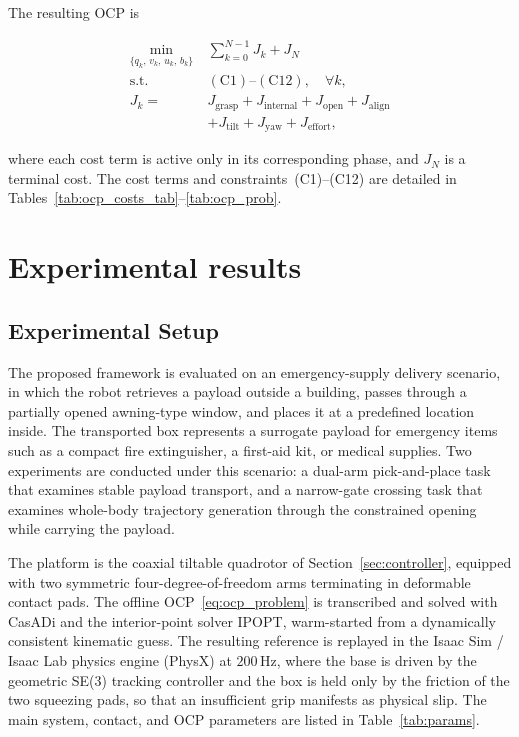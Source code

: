 \documentclass[letterpaper, 10 pt, conference]{ieeeconf}  %
\begin{document}
The resulting OCP is

\begin{equation}
\label{eq:ocp_problem}
\begin{aligned}
\min_{\{q_k,\,v_k,\,u_k,\,b_k\}}\ & \sum_{k=0}^{N-1} J_k + J_N\\[2pt]
\text{s.t.}\ & (\mathrm{C1})\text{--}(\mathrm{C12}),\quad \forall k,\\[3pt]
J_k =\ & J_{\mathrm{grasp}}+J_{\mathrm{internal}}+J_{\mathrm{open}}+J_{\mathrm{align}}\\
  & +J_{\mathrm{tilt}}+J_{\mathrm{yaw}}+J_{\mathrm{effort}},
\end{aligned}
\end{equation}

where each cost term is active only in its corresponding phase,
and $J_N$ is a terminal cost. The cost terms and
constraints~(C1)--(C12) are detailed in
Tables~\ref{tab:ocp_costs_tab}--\ref{tab:ocp_prob}.

\section{Experimental results}

\subsection{Experimental Setup}
The proposed framework is evaluated on an emergency-supply delivery scenario, in which the robot retrieves a payload outside a building, passes through a partially opened awning-type window, and places it at a predefined location inside.
The transported box represents a surrogate payload for emergency items such as a compact fire extinguisher, a first-aid kit, or medical supplies.
Two experiments are conducted under this scenario: a dual-arm pick-and-place task that examines stable payload transport, and a narrow-gate crossing task that examines whole-body trajectory generation through the constrained opening while carrying the payload.

The platform is the coaxial tiltable quadrotor of Section~\ref{sec:controller}, equipped with two symmetric four-degree-of-freedom arms terminating in deformable contact pads. The offline OCP~\eqref{eq:ocp_problem} is transcribed and solved with CasADi and the interior-point solver IPOPT, warm-started from a dynamically consistent kinematic guess. The resulting reference is replayed in the Isaac Sim / Isaac Lab physics engine (PhysX) at $200\,\mathrm{Hz}$, where the base is driven by the geometric SE(3) tracking controller and the box is held only by the friction of the two squeezing pads, so that an insufficient grip manifests as physical slip. The main system, contact, and OCP parameters are listed in Table~\ref{tab:params}.
\end{document}
